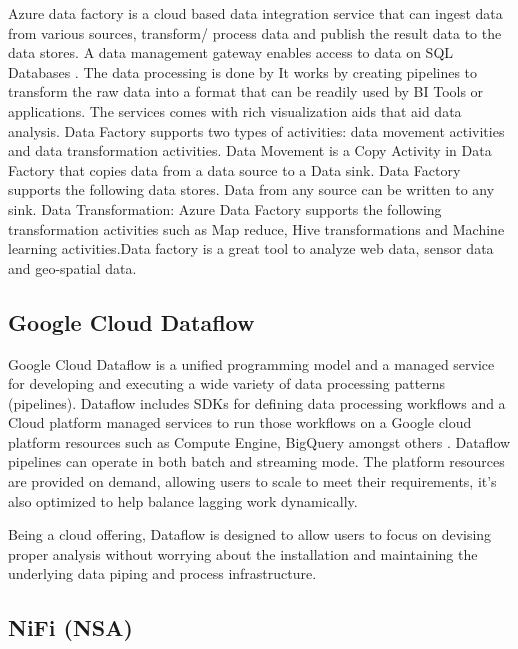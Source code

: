     Azure data factory is a cloud based data integration service that
    can ingest data from various sources, transform/ process data and
    publish the result data to the data stores. A data management
    gateway enables access to data on SQL Databases
    \cite{www-jamesserra}. The data processing is done by It works by
    creating pipelines to transform the raw data into a format that
    can be readily used by BI Tools or applications. The services
    comes with rich visualization aids that aid data analysis. Data
    Factory supports two types of activities: data movement activities
    and data transformation activities. Data Movement
    \cite{www-microsoft-azure} is a Copy Activity in Data Factory
    that copies data from a data source to a Data sink. Data Factory
    supports the following data stores. Data from any source can be
    written to any sink.  Data Transformation: Azure Data Factory
    supports the following transformation activities such as Map
    reduce, Hive transformations and Machine learning activities.Data
    factory is a great tool to analyze web data, sensor data and
    geo-spatial data.

\subsection{Google Cloud Dataflow}
    
    Google Cloud Dataflow is a unified programming model and a managed
    service for developing and executing a wide variety of data
    processing patterns (pipelines). Dataflow includes SDKs for
    defining data processing workflows and a Cloud platform managed
    services to run those workflows on a Google cloud platform
    resources such as Compute Engine, BigQuery amongst others
    \cite{www-Dataflow}. Dataflow pipelines can operate in both batch
    and streaming mode. The platform resources are provided on demand,
    allowing users to scale to meet their requirements, it’s also
    optimized to help balance lagging work dynamically.

    Being a cloud offering, Dataflow is designed to allow users to focus
    on devising proper analysis without worrying about the installation
    and maintaining \cite{www-GoogleLiveStream} the underlying data
    piping and process infrastructure.
    
\subsection{NiFi (NSA)}

